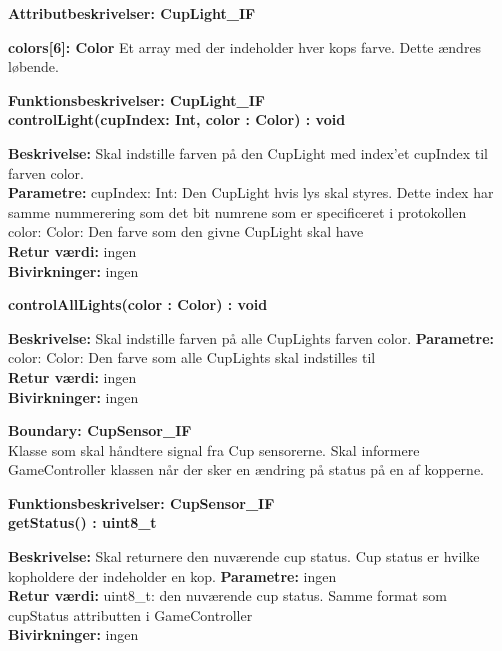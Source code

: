 \documentclass[Arkitektur/System_main.tex]{subfiles}
\begin{document}
{\large\textbf{Attributbeskrivelser: CupLight\_IF}}
\begin{adjustwidth}{1cm}{0pt}
\textbf{colors[6]: Color } Et array med der indeholder hver kops farve. Dette ændres løbende. \\[0.2cm]
\end{adjustwidth}
{\large\textbf{Funktionsbeskrivelser: CupLight\_IF}}\\[0.2cm]
\textbf{controlLight(cupIndex: Int, color : Color) : void}
\begin{adjustwidth}{1cm}{0pt}
\textbf{Beskrivelse:} Skal indstille farven på den CupLight med index'et cupIndex til farven color. \\[0.2cm]
\textbf{Parametre:}  cupIndex: Int: Den CupLight hvis lys skal styres. Dette index har samme nummerering som det bit numrene som er specificeret i protokollen\\color: Color: Den farve som den givne CupLight skal have \\[0.2cm]
\textbf{Retur værdi:} ingen \\[0.2cm]
\textbf{Bivirkninger:} ingen \\[0.2cm]
\end{adjustwidth}
\textbf{controlAllLights(color : Color) : void}
\begin{adjustwidth}{1cm}{0pt}
\textbf{Beskrivelse:} Skal indstille farven på alle CupLights farven color.
\textbf{Parametre:} color: Color: Den farve som alle CupLights skal indstilles til \\[0.2cm]
\textbf{Retur værdi:} ingen \\[0.2cm]
\textbf{Bivirkninger:} ingen \\[0.2cm]
\end{adjustwidth}


{\large\textbf{Boundary:  CupSensor\_IF}}\\
Klasse som skal håndtere signal fra Cup sensorerne. Skal informere GameController klassen når der sker en ændring på status på en af kopperne.

{\large\textbf{Funktionsbeskrivelser: CupSensor\_IF}}\\[0.2cm]
\textbf{getStatus() : uint8\_t}
\begin{adjustwidth}{1cm}{0pt}
\textbf{Beskrivelse:} Skal returnere den nuværende cup status. Cup status er hvilke kopholdere der indeholder en kop.
\textbf{Parametre:} ingen \\[0.2cm]
\textbf{Retur værdi:} uint8\_t: den nuværende cup status. Samme format som cupStatus attributten i GameController \\[0.2cm]
\textbf{Bivirkninger:} ingen \\[0.2cm]
\end{adjustwidth}
\end{document}
